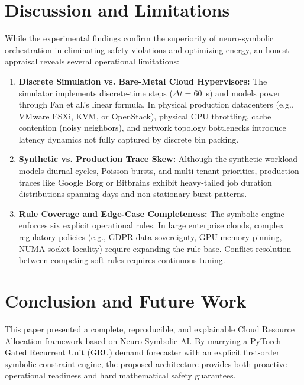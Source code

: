 \documentclass[conference]{IEEEtran}
\begin{document}
\section{Discussion and Limitations}
While the experimental findings confirm the superiority of neuro-symbolic orchestration in eliminating safety violations and optimizing energy, an honest appraisal reveals several operational limitations:

\begin{enumerate}
    \item \textbf{Discrete Simulation vs. Bare-Metal Cloud Hypervisors:} The simulator implements discrete-time steps ($\Delta t = 60$~s) and models power through Fan et al.'s linear formula. In physical production datacenters (e.g., VMware ESXi, KVM, or OpenStack), physical CPU throttling, cache contention (noisy neighbors), and network topology bottlenecks introduce latency dynamics not fully captured by discrete bin packing.
    \item \textbf{Synthetic vs. Production Trace Skew:} Although the synthetic workload models diurnal cycles, Poisson bursts, and multi-tenant priorities, production traces like Google Borg or Bitbrains exhibit heavy-tailed job duration distributions spanning days and non-stationary burst patterns.
    \item \textbf{Rule Coverage and Edge-Case Completeness:} The symbolic engine enforces six explicit operational rules. In large enterprise clouds, complex regulatory policies (e.g., GDPR data sovereignty, GPU memory pinning, NUMA socket locality) require expanding the rule base. Conflict resolution between competing soft rules requires continuous tuning.
\end{enumerate}

\section{Conclusion and Future Work}
This paper presented a complete, reproducible, and explainable Cloud Resource Allocation framework based on Neuro-Symbolic AI. By marrying a PyTorch Gated Recurrent Unit (GRU) demand forecaster with an explicit first-order symbolic constraint engine, the proposed architecture provides both proactive operational readiness and hard mathematical safety guarantees.
\end{document}
